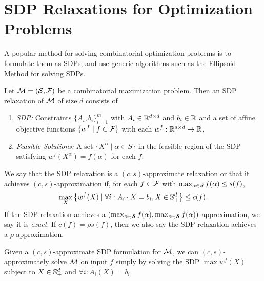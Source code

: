 \section{SDP Relaxations for Optimization Problems}\label{prelims_sdp_relaxations}
A popular method for solving combinatorial optimization problems is to formulate them as SDPs, and use generic algorithms such as the Ellipsoid Method for solving SDPs.
\begin{definition}
Let $\mathcal M = (\mathcal S, \mathcal F)$ be a combinatorial maximization problem. Then an
  SDP relaxation of \(\mathcal M\)
  of size \(d\)
  consists of
	\begin{enumerate}
	\item \emph{SDP:} Constraints $\{A_i, b_i\}_{i=1}^m$ with $A_i \in \mathbb R^{d \times d}$ and $b_i \in \mathbb R$ and a set of affine objective functions $\{w^f \mid f \in \mathcal F\}$ with each $w^f: \mathbb R^{d \times d} \rightarrow \mathbb R$,
	\item \emph{Feasible Solutions:} A set $\{X^\alpha \mid \alpha \in S\}$ in the feasible region of the SDP satisfying $w^f(X^\alpha) = f(\alpha)$ for each $f$.
	\end{enumerate}
	We say that the SDP relaxation is a $(c,s)$-approximate relaxation or that it achieves $(c,s)$-approximation if, for each
	$f \in \mathcal F$ with $\max_{\alpha \in \mathcal S} f(\alpha) \leq s(f)$,
	\[\max_X \left\{ w^f(X) \mid \forall i: A_i \cdot X = b_i, X \in \mathbb{S}^{d}_+\right\} \leq c(f).\]
	If the SDP relaxation achieves a $(\max_{\alpha\in \mathcal S} f(\alpha), \max_{\alpha\in \mathcal S} f(\alpha))$-approximation, we say it is \emph{exact}. If $c(f) = \rho s(f)$, then we also say the SDP relaxation achieves a $\rho$-approximation.
\end{definition}
Given a $(c,s)$-approximate SDP formulation for $\mathcal M$, we can $(c,s)$-approximately solve $\mathcal M$ on input $f$ simply by solving
the SDP $\max w^f(X)$ subject to $X \in \mathbb{S}^{d}_+$ and $\forall i: A_i(X) = b_i$.

